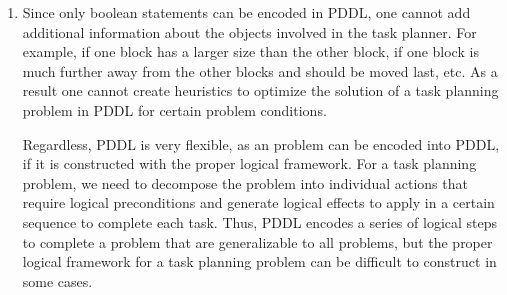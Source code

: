 \documentclass[11pt]{article}
\begin{document}
\begin{enumerate}[leftmargin=0.3in]
\begin{enumerate}
       \item Since only boolean statements can be encoded in PDDL, one cannot add additional information about the objects involved in the task planner. For example, if one block has a larger size than the other block, if one block is much further away from the other blocks and should be moved last, etc. As a result one cannot create heuristics to optimize the solution of a task planning problem in PDDL for certain problem conditions. 

           Regardless, PDDL is very flexible, as an problem can be encoded into PDDL, if it is constructed with the proper logical framework. For a task planning problem, we need to decompose the problem into individual actions that require logical preconditions and generate logical effects to apply in a certain sequence to complete each task. Thus, PDDL encodes a series of logical steps to complete a problem that are generalizable to all problems, but the proper logical framework for a task planning problem can be difficult to construct in some cases.

   \end{enumerate} %

\end{enumerate}
\end{document}
